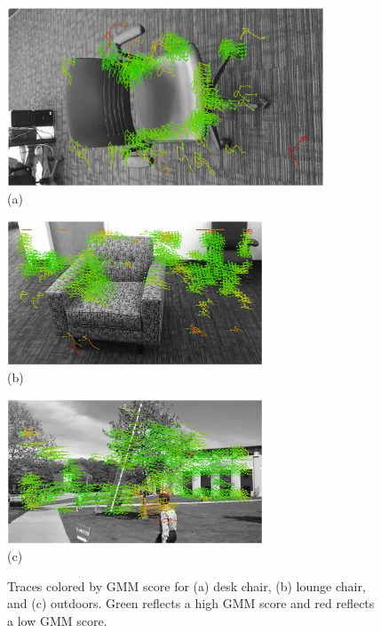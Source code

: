 \begin{figure}[tb]
	\begin{minipage}[b]{0.5\linewidth}
		\centering
		\includegraphics[height=2.1in,angle=-90]{figs/desk-1.eps}\\ (a)
	\end{minipage}
	\hspace{0.5cm}
	\begin{minipage}[b]{0.5\linewidth}
		\centering
		\begin{minipage}[b]{\linewidth}
			\centering
			\includegraphics[width=3in]{figs/lounge-1.eps} \\ (b)
		\end{minipage}
		\vspace{0.1cm}
		\begin{minipage}[b]{\linewidth}
			\centering
			\includegraphics[width=3in]{figs/outdoor3-90.eps} \\ (c)
		\end{minipage}

	\end{minipage}
	\caption{Traces colored by GMM score for (a) desk chair, (b) lounge chair, and (c) outdoors.  Green reflects a high GMM score and red reflects a low GMM score.}
	\label{fig:colored-traces}
\end{figure}



